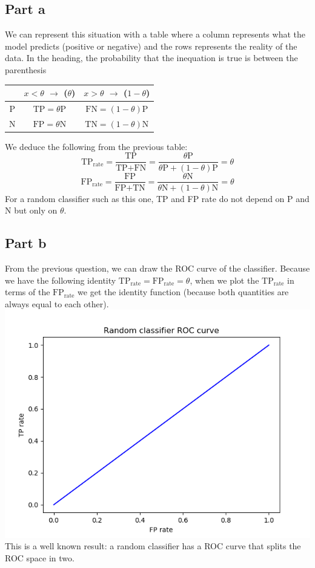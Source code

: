 \documentclass[a4paper, 10pt]{article}
\begin{document}
\subsection{Part a}
We can represent this situation with a table where a column represents what the model predicts (positive or negative)
and the rows represents the reality of the data. In the heading, the probability that the inequation is true is between the parenthesis
\\
\begin{center}
\begin{tabular}{ |c|c|c| }
    \hline
    \  & $x<\theta$ $\rightarrow$ ($\theta$) & $x>\theta$ $\rightarrow$ ($1-\theta$) \\
    \hline
    P & $\text{TP} = \theta \text{P}$ & $\text{FN} = (1-\theta) \text{P}$ \\
    N & $\text{FP} = \theta \text{N}$ & $\text{TN} = (1-\theta) \text{N}$ \\
    \hline
\end{tabular}
\end{center}
We deduce the following from the previous table:
$$
\text{TP}_{\text{rate}} = \frac{\text{TP}}{\text{TP}+\text{FN}} = \frac{\theta \text{P}}{\theta \text{P} +(1-\theta)\text{P}} = \theta
$$
$$
\text{FP}_{\text{rate}} = \frac{\text{FP}}{\text{FP}+\text{TN}} = \frac{\theta \text{N}}{\theta \text{N} + (1-\theta)\text{N}} = \theta
$$
For a random classifier such as this one, TP and FP rate do not depend
on P and N but only on $\theta$.

\subsection{Part b}
From the previous question, we can draw the ROC curve of the classifier.
Because we have the following identity $\text{TP}_\text{rate} = \text{FP}_\text{rate} = \theta$,
when we plot the $\text{TP}_\text{rate}$ in terms of the $\text{FP}_\text{rate}$ we get
the identity function (because both quantities are always equal to each other).
\\
\includegraphics{ex2b}
\\
This is a well known result: a random classifier has a ROC curve that
splits the ROC space in two.
\end{document}
